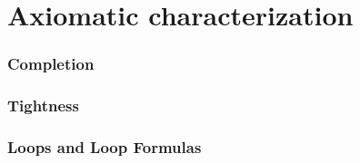 \part{Axiomatic characterization}
\section{Completion}

\section{Tightness}

\section{Loops and Loop Formulas}

%
